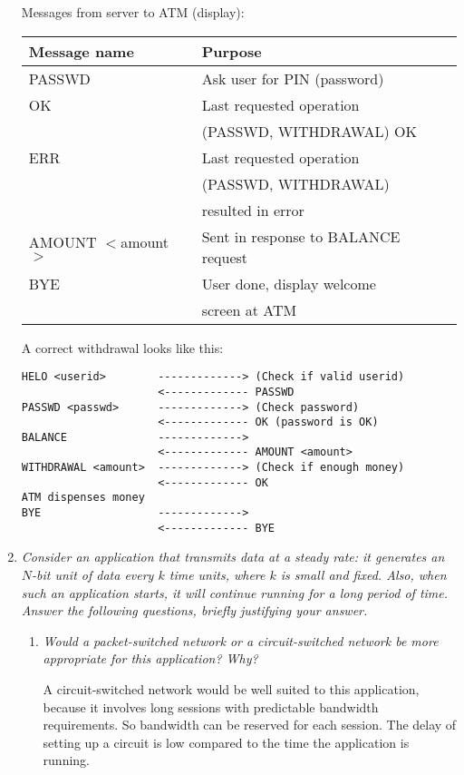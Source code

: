 \documentclass[11pt,a4paper]{article}
\begin{document}
\begin{enumerate}
  Messages from server to ATM (display):

  \begin{tabular}{l|l}
  Message name & Purpose\\
  \hline \hline
  PASSWD  & Ask user for PIN (password)\\
  OK      & Last requested operation\\
          & (PASSWD, WITHDRAWAL) OK\\
  ERR     & Last requested operation\\
          & (PASSWD, WITHDRAWAL)\\
          & resulted in error\\
  AMOUNT \(<\)amount\(>\) & Sent in response to
                            BALANCE request\\
  BYE     & User done, display welcome\\
          & screen at ATM
  \end{tabular}   

  A correct withdrawal looks like this:
{\small
  \begin{verbatim}
HELO <userid>        -------------> (Check if valid userid)
                     <------------- PASSWD
PASSWD <passwd>      -------------> (Check password)
                     <------------- OK (password is OK)
BALANCE              ------------->
                     <------------- AMOUNT <amount>
WITHDRAWAL <amount>  -------------> (Check if enough money)
                     <------------- OK
ATM dispenses money
BYE                  ------------->
                     <------------- BYE
  \end{verbatim}
}

  \item \emph{Consider an application that transmits data at a steady
  rate: it generates an \(N\)-bit unit of data every \(k\) time units,
  where \(k\) is small and fixed. Also, when such an application
  starts, it will continue running for a long period of time. Answer
  the following questions, briefly justifying your answer.}

  \begin{enumerate}
 
    \item \emph{Would a packet-switched network or a circuit-switched
    network be more appropriate for this application? Why?}

    A circuit-switched network would be well suited to this
    application, because it involves long sessions with predictable
    bandwidth requirements. So bandwidth can be reserved for each
    session. The delay of setting up a circuit is low compared to the
    time the application is running.


\end{enumerate}
\end{enumerate}
\end{document}
